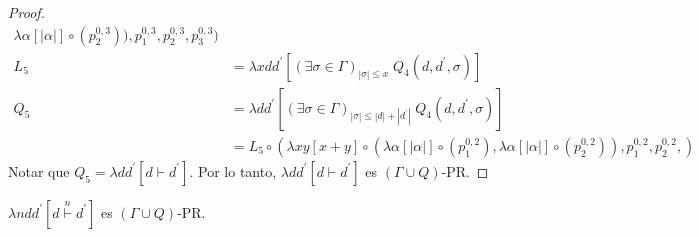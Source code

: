 \begin{lemma}
\begin{proof}
\begin{align*}
                        \lambda \alpha \left[ |\alpha|\right] \circ (p_{2}^{0,3})
                    ),
                    p_{1}^{0,3},
                    p_{2}^{0,3},
                    p_{3}^{0,3}
                  )\\[20pt]
      L_5 &=  \lambda x d d^{\prime }
                \left[
                  (\exists \sigma \in \Gamma)_{|\sigma| \leq x}\; Q_4(d,d^{\prime },\sigma)
                \right] \\[10pt]
      Q_5 &=  \lambda d d^{\prime }
                \left[
                  (\exists \sigma \in \Gamma)_{|\sigma| \leq |d| + |d^{\prime}|}\; Q_4(d,d^{\prime },\sigma)
                \right] \\
          &= L_5  \circ (
                    \lambda x y \left[ x + y \right]
                      \circ(
                        \lambda \alpha \left[ |\alpha|\right] \circ (p_{1}^{0,2}),
                        \lambda \alpha \left[ |\alpha|\right] \circ (p_{2}^{0,2})
                    ),
                    p_{1}^{0,2},
                    p_{2}^{0,2},
                  )
    \end{align*}
    Notar que $Q_5 = \lambda dd^{\prime } \left[ d\vdash d^{\prime }\right]$. Por lo tanto,
    $\lambda dd^{\prime } \left[ d\vdash d^{\prime }\right]$ es $(\Gamma \cup Q)$-PR.
  \end{proof}

  \end{lemma}

	\begin{proposition}
		$\lambda ndd^{\prime }\left[ d\overset{n}{\vdash }d^{\prime }\right] $ es $ (\Gamma \cup Q)$-PR.
	\end{proposition}


